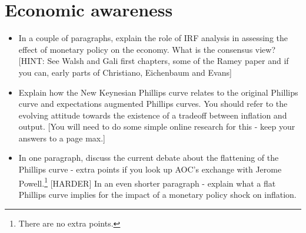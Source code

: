 \documentclass[authoryear,11pt]{elsarticle}
\begin{document}

\section{Economic awareness}
\begin{itemize}
\item	In a couple of paragraphs, explain the role of IRF analysis in assessing the effect of monetary policy on the economy. What is the consensus view? [HINT: See Walsh and Gali first chapters, some of the Ramey paper and if you can, early parts of Christiano, Eichenbaum and Evans]
\item	Explain how the New Keynesian Phillips curve relates to the original Phillips curve and expectations augmented Phillips curves. You should refer to the evolving attitude towards the existence of a tradeoff between inflation and output. [You will need to do some simple online research for this - keep your answers to a page max.] 
\item	In one paragraph, discuss the current debate about the flattening of the Phillips curve - extra points if you look up AOC's exchange with Jerome Powell.\footnote{There are no extra points.} [HARDER] In an even shorter paragraph - explain what a flat Phillips curve implies for the impact of a monetary policy shock on inflation.
\end{itemize}
\end{document}
